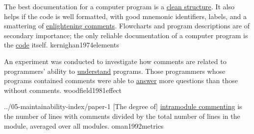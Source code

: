 \documentclass{article}
\begin{document}

  {The best documentation for a computer program is a \ul{clean structure}. It also helps if the code is well formatted, with good mnemonic identifiers, labels, and a smattering of \ul{enlightening comments}. Flowcharts and program descriptions are of secondary importance; the only reliable documentation of a computer program is the \ul{code} itself.}
  {kernighan1974elements}


  {An experiment was conducted to investigate how comments are related to programmers' ability to \ul{understand} programs. Those programmers whose programs contained comments were able to \ul{answer} more questions than those without comments.}
  {woodfield1981effect}

\lnQuote
  {../05-maintainability-index/paper-1}
  {[The degree of] \ul{intramodule commenting} is the number of lines with comments divided by the total number of lines in the module, averaged over all modules.}
  {oman1992metrics}
\end{document}
